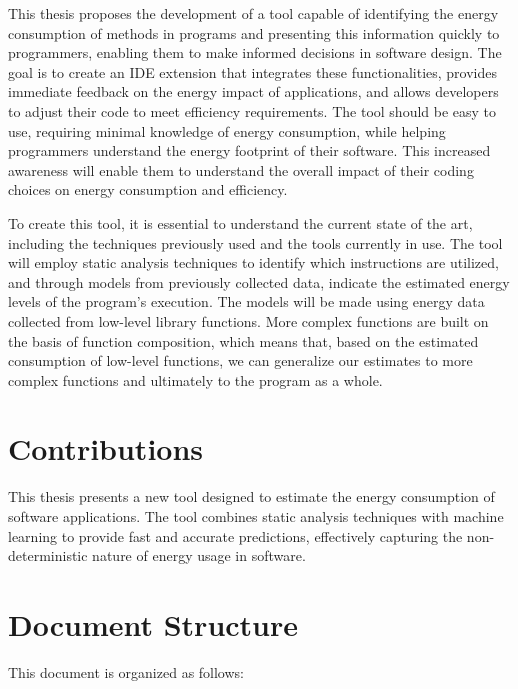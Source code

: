 This thesis proposes the development of a tool capable of identifying the energy consumption of methods in programs and presenting this information quickly to programmers, enabling them to make informed decisions in software design. The goal is to create an IDE extension that integrates these functionalities, provides immediate feedback on the energy impact of applications, and allows developers to adjust their code to meet efficiency requirements. The tool should be easy to use, requiring minimal knowledge of energy consumption, while helping programmers understand the energy footprint of their software. This increased awareness will enable them to understand the overall impact of their coding choices on energy consumption and efficiency.

To create this tool, it is essential to understand the current state of the art, including the techniques previously used and the tools currently in use. The tool will employ static analysis techniques to identify which instructions are utilized, and through models from previously collected data, indicate the estimated energy levels of the program's execution. The models will be made using energy data collected from low-level library functions. More complex functions are built on the basis of function composition, which means that, based on the estimated consumption of low-level functions, we can generalize our estimates to more complex functions and ultimately to the program as a whole. 



\section{Contributions}

This thesis presents a new tool designed to estimate the energy consumption of software applications. The tool combines static analysis techniques with machine learning to provide fast and accurate predictions, effectively capturing the non-deterministic nature of energy usage in software.

\section{Document Structure}

This document is organized as follows:

